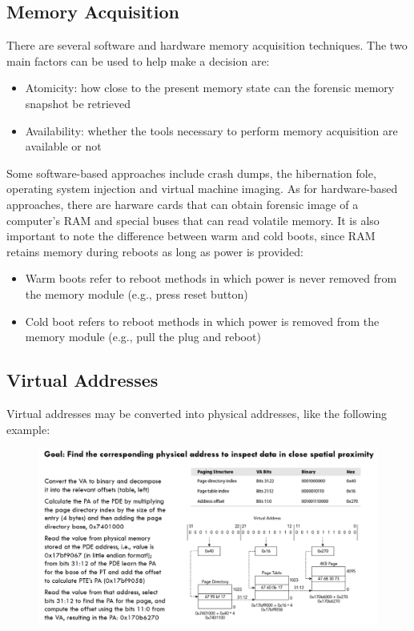 \documentclass[10pt,a4paper]{report}
\begin{document}
\subsection{Memory Acquisition}
There are several software and hardware memory acquisition techniques. The two main factors can be used to help make a decision are:
\begin{itemize}
\item Atomicity: how close to the present memory state can the forensic memory snapshot be retrieved
\item Availability: whether the tools necessary to perform memory acquisition are available or not
\end{itemize}
Some software-based approaches include crash dumps, the hibernation fole, operating system injection and virtual machine imaging. As for hardware-based approaches, there are harware cards that can obtain forensic image of a computer’s RAM and special buses that can read volatile memory. It is also important to note the difference between warm and cold boots, since RAM retains memory during reboots as long as power is provided:
\begin{itemize}
\item Warm boots refer to reboot methods in which power is never removed from the memory module (e.g., press reset button)
\item Cold boot refers to reboot methods in which power is removed from the memory module (e.g., pull the plug and reboot)
\end{itemize}
\subsection{Virtual Addresses}
Virtual addresses may be converted into physical addresses, like the following example:
\begin{figure}[H]
\centering
\includegraphics[scale=0.5]{9.png}
\end{figure}
\end{document}
